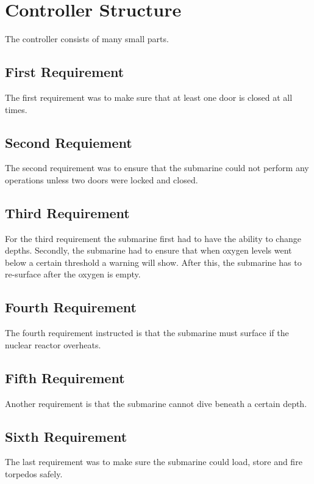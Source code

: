 \section{Controller Structure}
The controller consists of many small parts.

\subsection{First Requirement}
The first requirement was to make sure that at least one door is closed at all times.

\subsection{Second Requiement}
The second requirement was to ensure that the submarine could not perform any operations unless two doors were locked and closed.

\subsection{Third Requirement}
For the third requirement the submarine first had to have the ability to change depths. Secondly, the submarine had to ensure that when oxygen levels went below a certain threshold a warning will show. After this, the submarine has to re-surface after the oxygen is empty. 

\subsection{Fourth Requirement}
The fourth requirement instructed is that the submarine must surface if the nuclear reactor overheats. 

\subsection{Fifth Requirement}
Another requirement is that the submarine cannot dive beneath a certain depth.

\subsection{Sixth Requirement}
The last requirement was to make sure the submarine could load, store and fire torpedos safely.